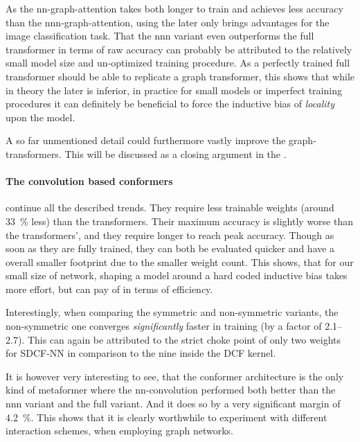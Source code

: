 As the nn-graph-attention takes both longer to train and achieves less accuracy than the nnn-graph-attention, using the later only brings advantages for the image classification task.
That the nnn variant even outperforms the full transformer in terms of raw accuracy can probably be attributed to the relatively small model size and un-optimized training procedure.
As a perfectly trained full transformer should be able to replicate a graph transformer, this shows that while in theory the later is inferior, in practice for small models or imperfect training procedures it can definitely be beneficial to force the inductive bias of \emph{locality} upon the model.

A so far unmentioned detail could furthermore vastly improve the graph-transformers. 
This will be discussed as a closing argument in the .

\paragraph{The convolution based conformers} continue all the described trends.
They require less trainable weights (around \SI[]{33}[]{\percent} less) than the transformers.
Their maximum accuracy is slightly worse than the transformers', and they require longer to reach peak accuracy.
Though as soon as they are fully trained, they can both be evaluated quicker and have a overall smaller footprint due to the smaller weight count.
This shows, that for our small size of network, shaping a model around a hard coded inductive bias takes more effort, but can pay of in terms of efficiency.

Interestingly, when comparing the symmetric and non-symmetric variants, the non-symmet\-ric one converges \emph{significantly} faster in training (by a factor of \SIrange[]{2.1}{2.7}{}). 
This can again be attributed to the strict choke point of only two weights for SDCF-NN in comparison to the nine inside the DCF kernel.

It is however very interesting to see, that the conformer architecture is the only kind of metaformer where the nn-convolution performed both better than the nnn variant and the full variant.
And it does so by a very significant margin of \SI[]{4.2}[]{\percent}.
This shows that it is clearly worthwhile to experiment with different interaction schemes, when employing graph networks.

